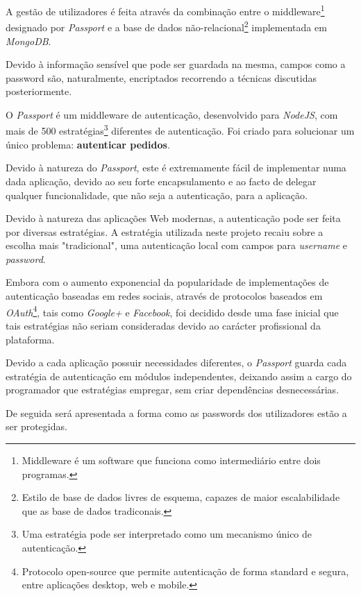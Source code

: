 A gestão de utilizadores é feita através da combinação entre o middleware\footnote{Middleware é um software que funciona como intermediário entre dois programas.} designado por \emph{Passport} e a base de dados não-relacional\footnote{Estilo de base de dados livres de esquema, capazes de maior escalabilidade que as base de dados tradiconais.} implementada em \emph{MongoDB}.

Devido à informação sensível que pode ser guardada na mesma, campos como a password são, naturalmente, encriptados recorrendo a técnicas discutidas posteriormente.

O \emph{Passport} é um middleware de autenticação, desenvolvido para \emph{NodeJS}, com mais de 500 estratégias\footnote{Uma estratégia pode ser interpretado como um mecanismo único de autenticação.} diferentes de autenticação. Foi criado para solucionar um único problema: \textbf{autenticar pedidos}.

Devido à natureza do \emph{Passport}, este é extremamente fácil de implementar numa dada aplicação, devido ao seu forte encapsulamento e ao facto de delegar qualquer funcionalidade, que não seja a autenticação, para a aplicação.

Devido à natureza das aplicações Web modernas, a autenticação pode ser feita por diversas estratégias. A estratégia utilizada neste projeto recaiu sobre a escolha mais "tradicional", uma autenticação local com campos para \emph{username} e \emph{password}.

Embora com o aumento exponencial da popularidade de implementações de autenticação baseadas em redes sociais, através de protocolos baseados em \emph{OAuth}\footnote{Protocolo open-source que permite autenticação de forma standard e segura, entre aplicações desktop, web e mobile.}, tais como \emph{Google+} e \emph{Facebook}, foi decidido desde uma fase inicial que tais estratégias não seriam consideradas devido ao carácter profissional da plataforma.

Devido a cada aplicação possuir necessidades diferentes, o \emph{Passport} guarda cada estratégia de autenticação em módulos independentes, deixando assim a cargo do programador que estratégias empregar, sem criar dependências desnecessárias.

De seguida será apresentada a forma como as passwords dos utilizadores estão a ser protegidas.

